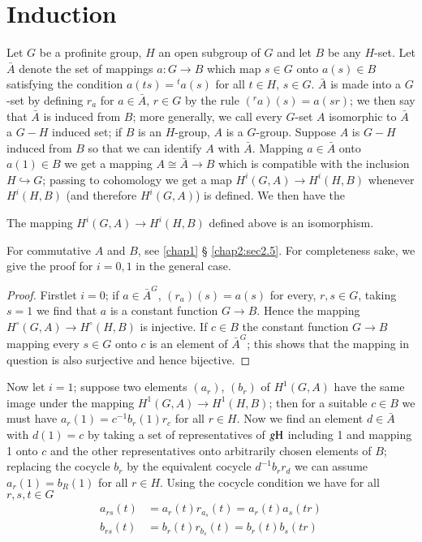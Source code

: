 \section{Induction}\label{chap1:sec1.3}

Let $G$ be a profinite group, $H$ an open subgroup of $G$ and let $B$
be any $H$-set. Let $\bar{A}$ denote the set of mappings
$a:G\rightarrow B$ which map $s \in G$ onto $a(s)\in B$ satisfying the
condition $a(ts) =  {}^{t}a(s)$ for all $t \in H$, $s \in G$. $\bar{A}$
is made into a $G$-set by defining $r_a$ for $a \in \bar{A}$, $r\in G$
by the rule $({}^r a)(s) = a(sr)$; we then say that $\bar{A}$ is induced
from $B$; more generally, we call every $G$-set $A$ isomorphic to
$\bar{A}$ a $G-H$ induced set; if $B$ is an $H$-group, $A$ is a
$G$-group. Suppose $A$ is $G-H$ induced from $B$ so that we can
identify $A$ with $\bar{A}$. Mapping $a \in \bar{A}$ onto $a(1) \in B$
we get a mapping $A \cong \bar{A} \rightarrow B$ which is compatible
with the inclusion $H \hookrightarrow G$; passing to cohomology we get
a map $H^i(G,A) \rightarrow H^i(H,B)$ whenever $H^i(H,B)$ (and
therefore $H^i(G,A)$) is defined. We then have the  

\begin{lem}\label{chap1:lem1}%
The mapping $H^i(G,A) \rightarrow H^i(H,B)$ defined
above is an isomorphism. 

For commutative $A$ and $B$, see \cite{keyS2} \ref{chap1} \S
\ref{chap2:sec2.5}. For 
completeness sake, we give the proof for $i = 0,1$ in the general
case. 
\end{lem}

\begin{proof}
 First\pageoriginale let $i=0$; if $a\in {\bar A}^G$, $(r_a)(s)=a(s)$ for
every, $r,s\in G$, taking $s=1$ we find that $a$ is a constant
function $G\longrightarrow B$. Hence the mapping
$H^{\circ}(G,A)\longrightarrow H^{\circ}(H,B)$ is injective. If $c\in
B$ the constant function  $G\longrightarrow B$ mapping every $s\in G$
onto $c$ is an element of ${\bar A}^G$; this shows that the mapping in
question is also surjective and hence bijective.   
\end{proof}

Now let $i=1$; suppose two elements $(a_r)$, $(b_r)$ of $H^1(G,A)$
have the same image under the mapping $H^1(G,A)\longrightarrow
H^1(H,B)$; then for a suitable $c\in B$ we must have
$a_r(1)=c^{-1}b_r(1)r_c$ for all $r\in H$. Now we find an element
$d\in\bar A$ with $d(1)=c$ by taking a set of representatives of
$g\mbox H$ including 1 and mapping 1 onto $c$ and the other
representatives onto arbitrarily chosen elements of $B$; replacing the
cocycle $b_r$ by the equivalent cocycle $d^{-1}b_rr_d$ we can assume
$a_r(1)=b_R(1)$ for all $r\in H$. Using the cocycle condition we have
for all $r,s,t\in G$ 
\begin{align*}
a_{rs}(t) & = a_r(t)r_{a_s}(t)=a_r(t)a_s(tr)\\
b_{rs}(t) & = b_r(t)r_{b_s}(t)=b_r(t)b_s(tr)
\end{align*}

